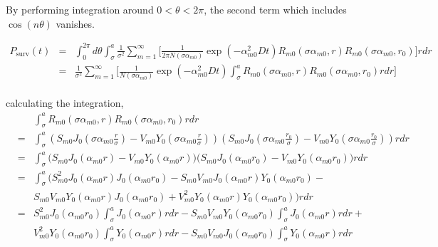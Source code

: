 \documentclass{article}
\begin{document}
By performing integration around $0 < \theta < 2\pi$, the second term which
includes $\cos(n\theta)$ vanishes.

\begin{eqnarray}
    P_{\mathrm{surv}}(t)
        &=& \int_0^{2\pi}d\theta \int_\sigma^a \frac{1}{\sigma^2} \sum_{m=1}^{\infty} \Bigg[
            \frac{1}{2\pi N(\sigma\alpha_{m0})} \exp(-\alpha_{m0}^2Dt)
            R_{m0}(\sigma\alpha_{m0}, r) R_{m0}(\sigma\alpha_{m0}, r_0)
            \Bigg] rdr \nonumber\\
        &=& \frac{1}{\sigma^2} \sum_{m=1}^{\infty} \Bigg[
            \frac{1}{N(\sigma\alpha_{m0})} \exp(-\alpha_{m0}^2Dt)
            \int_\sigma^a R_{m0}(\sigma\alpha_{m0}, r) R_{m0}(\sigma\alpha_{m0}, r_0)
            rdr \Bigg] \nonumber\\
\end{eqnarray}

calculating the integration,
\begin{eqnarray}
    & & \int_\sigma^a R_{m0}(\sigma\alpha_{m0}, r) R_{m0}(\sigma\alpha_{m0}, r_0) rdr \nonumber\\
    &=& \int_\sigma^a \left(S_{m0} J_0\left(\sigma\alpha_{m0} \frac{r}{\sigma}\right) -
                            V_{m0} Y_0\left(\sigma\alpha_{m0} \frac{r}{\sigma}\right)\right)
                      \left(S_{m0} J_0\left(\sigma\alpha_{m0} \frac{r_0}{\sigma}\right) -
                            V_{m0} Y_0\left(\sigma\alpha_{m0} \frac{r_0}{\sigma}\right)\right)rdr\\
    &=& \int_\sigma^a \Big(S_{m0} J_0(\alpha_{m0} r  ) - V_{m0} Y_0(\alpha_{m0} r  )\Big)
                      \Big(S_{m0} J_0(\alpha_{m0} r_0) - V_{m0} Y_0(\alpha_{m0} r_0)\Big)rdr\\
    &=& \int_\sigma^a \Big(
            S_{m0}^2     J_0(\alpha_{m0} r) J_0(\alpha_{m0} r_0) -
            S_{m0}V_{m0} J_0(\alpha_{m0} r) Y_0(\alpha_{m0} r_0) - \nonumber\\
    & &     S_{m0}V_{m0} Y_0(\alpha_{m0} r) J_0(\alpha_{m0} r_0) +
            V_{m0}^2     Y_0(\alpha_{m0} r) Y_0(\alpha_{m0} r_0)
        \Big)rdr\\
    &=& S_{m0}^2     J_0(\alpha_{m0} r_0) \int_\sigma^a J_0(\alpha_{m0} r) rdr -
        S_{m0}V_{m0} Y_0(\alpha_{m0} r_0) \int_\sigma^a J_0(\alpha_{m0} r) rdr + \nonumber\\
    & & V_{m0}^2     Y_0(\alpha_{m0} r_0) \int_\sigma^a Y_0(\alpha_{m0} r) rdr -
        S_{m0}V_{m0} J_0(\alpha_{m0} r_0) \int_\sigma^a Y_0(\alpha_{m0} r) rdr   \nonumber
\end{eqnarray}
\end{document}

